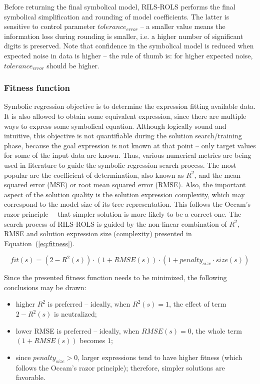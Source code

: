 \documentclass{bmcart}
\begin{document}
Before returning the final symbolical model, \textsc{RILS}-\textsc{ROLS}  performs the final symbolical simplification and rounding of model coefficients. The latter is sensitive to control parameter $tolerance_{error}$ -- a smaller value means the information loss during rounding is smaller, i.e. a higher number of significant digits is preserved. Note that confidence in the symbolical model is reduced when expected noise in data is higher -- the rule of thumb is: for higher expected noise, $tolerance_{error}$ should be higher. 


\subsubsection{Fitness function}\label{sec:fitness}


Symbolic regression objective is to determine the expression fitting available data. It is also allowed to obtain some equivalent expression, since there are multiple ways to express some symbolical equation. Although logically sound and intuitive, this objective is not quantifiable during the solution search/training phase, because the goal expression is not known at that point -- only target values for some of the input data are known. Thus, various numerical metrics are being used in literature to guide the symbolic regression search process. The most popular are the coefficient of determination, also known as $R^2$, and the mean squared error (MSE) or root mean squared error (RMSE). Also, the important aspect of the solution quality is the solution expression complexity, which may correspond to the model size of its tree representation. This follows the Occam's razor principle~\cite{costa2020fast}~ that simpler solution  is more likely to be a correct one. 
The search process of \textsc{RILS}-\textsc{ROLS}  is guided by the non-linear combination of $R^2$, RMSE and solution expression size (complexity) presented in Equation~(\ref{eq:fitness}). 

\begin{equation}
	\label{eq:fitness}
	fit(s) = (2-R^2(s)) \cdot (1+RMSE(s)) \cdot (1+penalty_{size} \cdot size(s))
\end{equation}

Since the presented fitness function needs to be minimized, the following conclusions may be drawn:
\begin{itemize}
	\item higher $R^2$ is preferred -- ideally, when $R^2(s)=1$, the effect of term $2-R^2(s)$ is neutralized; %
	\item lower RMSE is preferred -- ideally, when $RMSE(s)=0$, the whole term $(1+RMSE(s))$ becomes 1;
	\item since $penalty_{size} > 0$, larger expressions tend to have higher fitness (which follows the Occam's razor principle); therefore, simpler solutions are favorable. 
\end{itemize}
\end{document}
